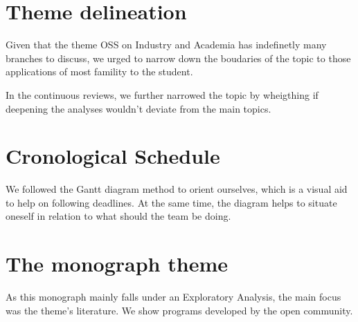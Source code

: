 \documentclass[
12pt,				%
openright,			%
oneside,			%
a4paper,			%
brazil,				%
english,			%
]{abntex2}
\begin{document}
\section{Theme delineation}
Given that the theme OSS on Industry and Academia has indefinetly many
branches to discuss, we urged to narrow down the boudaries of the
topic to those applications of most famility to the student.

In the continuous reviews, we further narrowed the topic by wheigthing
if deepening the analyses wouldn't deviate from the main topics.

\section{Cronological Schedule}

We followed the Gantt diagram method to orient ourselves, which is a
visual aid to help on following deadlines. At the same time, the
diagram helps to situate oneself in relation to what should the team
be doing.

\section{The monograph theme}

As this monograph mainly falls under an Exploratory Analysis, the main
focus was the theme's literature. We show programs developed by the
open community. 

\end{document}
